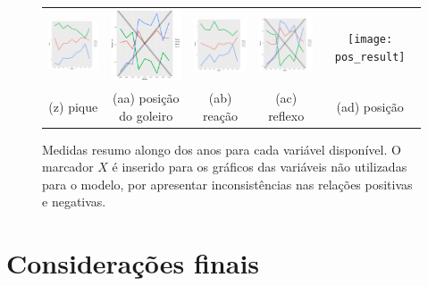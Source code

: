 \documentclass[doc,apacite,oneside,a4paper,12pt]{apa6}
\begin{document}
\begin{figure}
\begin{tabular}{ccccc}
    \includegraphics[width=25mm]{pique_result}  & \includegraphics[width=25mm]{posicion_gl_result} &   \includegraphics[width=25mm]{reacao_result}&
  \includegraphics[width=25mm]{reflexos_result}    & \texttt{[image: pos\_result]}    \\
 \scriptsize{(z) pique} & \scriptsize{(aa) posição do goleiro} & \scriptsize{(ab) reação} & \scriptsize{(ac) reflexo} & \scriptsize{(ad) posição} \\[3pt]

\end{tabular}
    \caption[\scriptsize{Medidas resumo.}]{\scriptsize{Medidas resumo alongo dos anos para cada variável disponível. O marcador $X$ é inserido para os gráficos das variáveis não utilizadas para o modelo, por apresentar inconsistências nas relações positivas e negativas.}}
\end{figure}




 
\section{Considerações finais}
\label{sec:conclu}
\noindent



\end{document}
